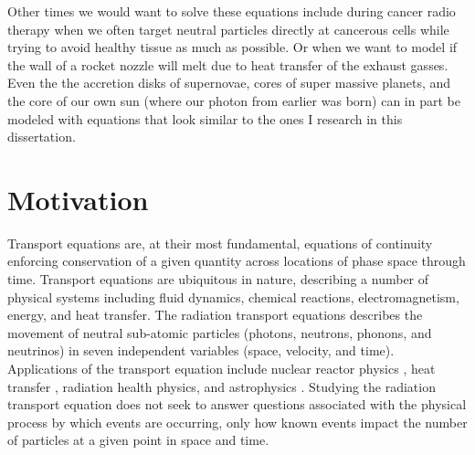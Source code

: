 Other times we would want to solve these equations include during cancer radio therapy when we often target  neutral particles directly at cancerous cells while trying to avoid healthy tissue as much as possible.
Or when we want to model if the wall of a rocket nozzle will melt due to heat transfer of the exhaust gasses.
Even the the accretion disks of supernovae, cores of super massive planets, and the core of our own sun (where our photon from earlier was born) can in part be modeled with equations that look similar to the ones I research in this dissertation.


\section{Motivation}

Transport equations are, at their most fundamental, equations of continuity enforcing conservation of a given quantity across locations of phase space through time.
Transport equations are ubiquitous in nature, describing a number of physical systems including fluid dynamics, chemical reactions, electromagnetism, energy, and heat transfer.
The radiation transport equations describes the movement of neutral sub-atomic particles (photons, neutrons, phonons, and neutrinos) in seven independent variables (space, velocity, and time).
Applications of the transport equation include nuclear reactor physics \cite{duderstadt_hamilton}, heat transfer \cite{radheattrans2003}, radiation health physics, and astrophysics \cite{chandrasekhar1960radiative}.
Studying the radiation transport equation does not seek to answer questions associated with the physical process by which events are occurring, only how known events impact the number of particles at a given point in space and time.

